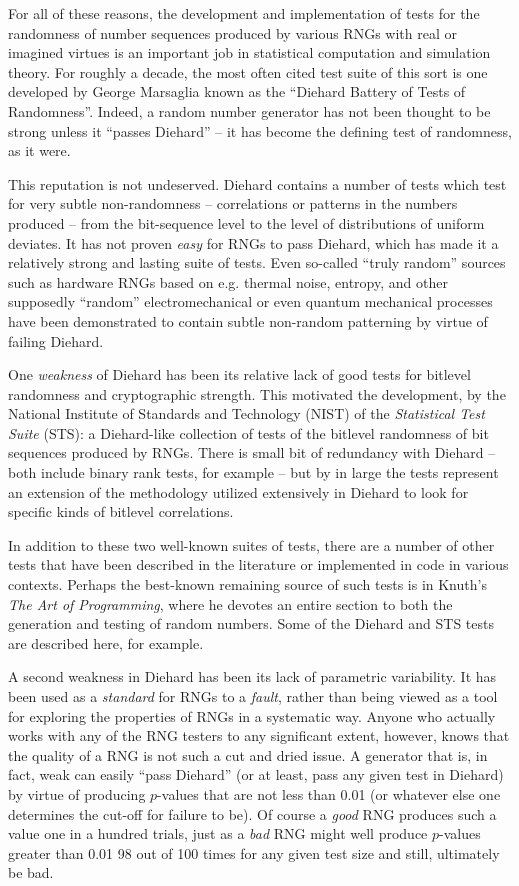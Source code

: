 \documentclass[12pt]{book}
\begin{document}
For all of these reasons, the development and implementation of tests
for the randomness of number sequences produced by various RNGs with
real or imagined virtues is an important job in statistical computation
and simulation theory.  For roughly a decade, the most often cited test
suite of this sort is one developed by George Marsaglia known as the
``Diehard Battery of Tests of Randomness''\cite{Marsaglia}.  Indeed, a
random number generator has not been thought to be strong unless it
``passes Diehard'' -- it has become the defining test of randomness, as
it were.

This reputation is not undeserved.  Diehard contains a number of tests
which test for very subtle non-randomness -- correlations or patterns in
the numbers produced -- from the bit-sequence level to the level of
distributions of uniform deviates.  It has not proven {\em easy} for
RNGs to pass Diehard, which has made it a relatively strong and lasting
suite of tests.  Even so-called ``truly random'' sources such as
hardware RNGs based on e.g. thermal noise, entropy, and other supposedly
``random'' electromechanical or even quantum mechanical processes have
been demonstrated to contain subtle non-random patterning by virtue of
failing Diehard.

One {\em weakness} of Diehard has been its relative lack of good tests
for bitlevel randomness and cryptographic strength.  This motivated the
development, by the National Institute of Standards and Technology
(NIST) of the {\em Statistical Test Suite} (STS): a Diehard-like
collection of tests of the bitlevel randomness of bit sequences produced
by RNGs\cite{STS}.  There is small bit of redundancy with Diehard --
both include binary rank tests, for example -- but by in large the tests
represent an extension of the methodology utilized extensively in
Diehard to look for specific kinds of bitlevel correlations.

In addition to these two well-known suites of tests, there are a number
of other tests that have been described in the literature or implemented
in code in various contexts.  Perhaps the best-known remaining source of
such tests is in Knuth's {\em The Art of Programming}\cite{Knuth}, where
he devotes an entire section to both the generation and testing of
random numbers.  Some of the Diehard and STS tests are described here,
for example.

A second weakness in Diehard has been its lack of parametric
variability.  It has been used as a {\em standard} for RNGs to a {\em
fault}, rather than being viewed as a tool for exploring the properties
of RNGs in a systematic way.  Anyone who actually works with any of the
RNG testers to any significant extent, however, knows that the quality
of a RNG is not such a cut and dried issue.  A generator that is, in
fact, weak can easily ``pass Diehard'' (or at least, pass any given test
in Diehard) by virtue of producing $p$-values that are not less than
0.01 (or whatever else one determines the cut-off for failure to be).
Of course a {\em good} RNG produces such a value one in a hundred
trials, just as a {\em bad} RNG might well produce $p$-values greater
than 0.01 98 out of 100 times for any given test size and still,
ultimately be bad.
\end{document}
